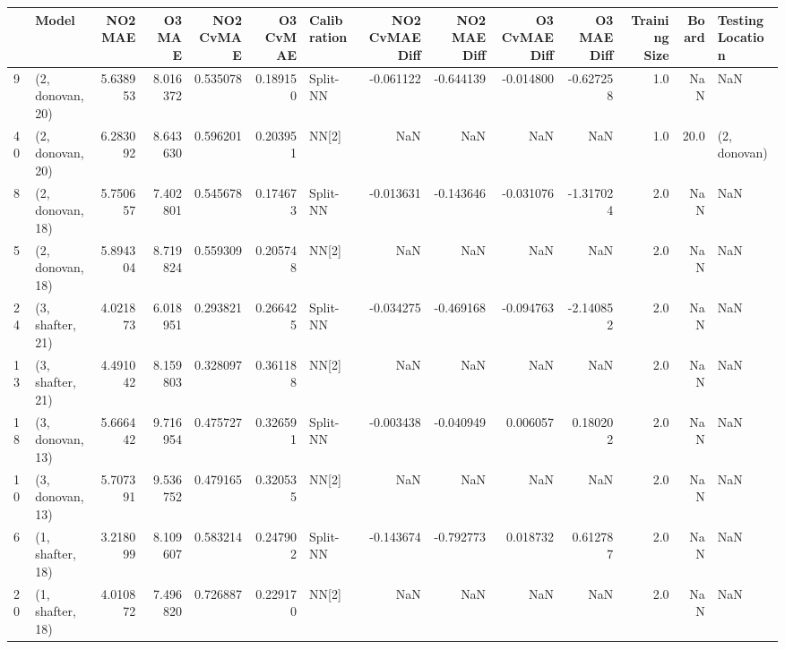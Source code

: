 \begin{tabular}{llrrrrlrrrrrrl}
\toprule
{} &             Model &   NO2 MAE &     O3 MAE &  NO2 CvMAE &  O3 CvMAE & Calibration &  NO2 CvMAE Diff &  NO2 MAE Diff &  O3 CvMAE Diff &  O3 MAE Diff &  Training Size &  Board & Testing Location \\
\midrule
9  &  (2, donovan, 20) &  5.638953 &   8.016372 &   0.535078 &  0.189150 &    Split-NN &       -0.061122 &     -0.644139 &      -0.014800 &    -0.627258 &            1.0 &    NaN &              NaN \\
40 &  (2, donovan, 20) &  6.283092 &   8.643630 &   0.596201 &  0.203951 &       NN[2] &             NaN &           NaN &            NaN &          NaN &            1.0 &   20.0 &     (2, donovan) \\
8  &  (2, donovan, 18) &  5.750657 &   7.402801 &   0.545678 &  0.174673 &    Split-NN &       -0.013631 &     -0.143646 &      -0.031076 &    -1.317024 &            2.0 &    NaN &              NaN \\
5  &  (2, donovan, 18) &  5.894304 &   8.719824 &   0.559309 &  0.205748 &       NN[2] &             NaN &           NaN &            NaN &          NaN &            2.0 &    NaN &              NaN \\
24 &  (3, shafter, 21) &  4.021873 &   6.018951 &   0.293821 &  0.266425 &    Split-NN &       -0.034275 &     -0.469168 &      -0.094763 &    -2.140852 &            2.0 &    NaN &              NaN \\
13 &  (3, shafter, 21) &  4.491042 &   8.159803 &   0.328097 &  0.361188 &       NN[2] &             NaN &           NaN &            NaN &          NaN &            2.0 &    NaN &              NaN \\
18 &  (3, donovan, 13) &  5.666442 &   9.716954 &   0.475727 &  0.326591 &    Split-NN &       -0.003438 &     -0.040949 &       0.006057 &     0.180202 &            2.0 &    NaN &              NaN \\
10 &  (3, donovan, 13) &  5.707391 &   9.536752 &   0.479165 &  0.320535 &       NN[2] &             NaN &           NaN &            NaN &          NaN &            2.0 &    NaN &              NaN \\
6  &  (1, shafter, 18) &  3.218099 &   8.109607 &   0.583214 &  0.247902 &    Split-NN &       -0.143674 &     -0.792773 &       0.018732 &     0.612787 &            2.0 &    NaN &              NaN \\
20 &  (1, shafter, 18) &  4.010872 &   7.496820 &   0.726887 &  0.229170 &       NN[2] &             NaN &           NaN &            NaN &          NaN &            2.0 &    NaN &              NaN \\

\end{tabular}
